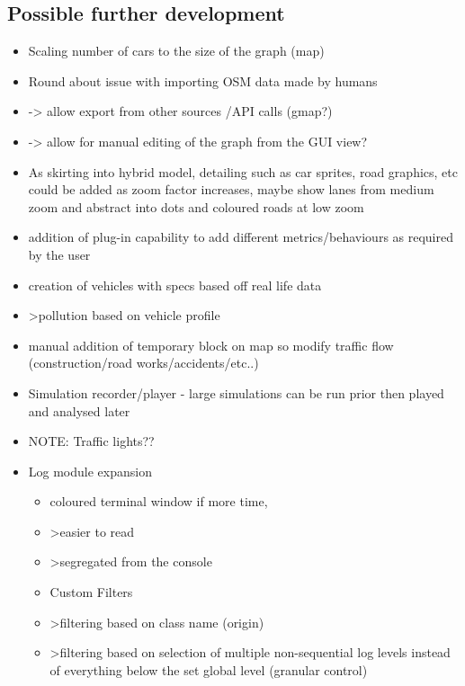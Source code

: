 \subsection{Possible further development}
\begin{itemize}
	\item Scaling number of cars to the size of the graph  (map)
	\item Round about issue with importing OSM data made by humans 
	\item -> allow export from other sources /API calls (gmap?)
	\item -> allow for manual editing of the graph from the GUI view?
	\item As skirting into hybrid model, detailing such as car sprites, road graphics, etc could be added as zoom factor increases, maybe show lanes from medium zoom and abstract into dots and coloured roads at low zoom
	\item addition of plug-in capability to add different metrics/behaviours as required by the user
	\item creation of vehicles with specs based off real life data
	\item >pollution based on vehicle profile
	\item manual addition of temporary block on map so modify traffic flow (construction/road works/accidents/etc..)
	\item Simulation recorder/player - large simulations can be run prior then played and analysed later
	\item NOTE: Traffic lights??
\end{itemize}

\begin{itemize}
    \item Log module expansion
    \begin{itemize}
        \item coloured terminal window if more time,
        \item >easier to read
        \item >segregated from the console
        \item Custom Filters
        \item >filtering based on class name (origin)
        \item >filtering based on selection of multiple non-sequential log levels instead of everything below the set global level (granular control)
    \end{itemize}
\end{itemize}

